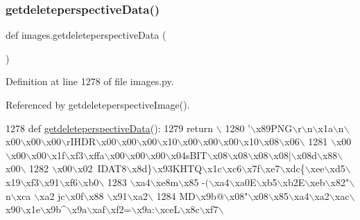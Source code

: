 \subsubsection{\texorpdfstring{getdeleteperspective\+Data()}{getdeleteperspectiveData()}}
{\footnotesize\ttfamily def images.\+getdeleteperspective\+Data (\begin{DoxyParamCaption}{ }\end{DoxyParamCaption})}



Definition at line 1278 of file images.\+py.



Referenced by getdeleteperspective\+Image().


\begin{DoxyCode}
1278 \textcolor{keyword}{def }\hyperlink{namespaceimages_adf4a80b7f1fe515d188f8edc76ad9f8c}{getdeleteperspectiveData}():
1279     \textcolor{keywordflow}{return} \(\backslash\)
1280 \textcolor{stringliteral}{'\(\backslash\)x89PNG\(\backslash\)r\(\backslash\)n\(\backslash\)x1a\(\backslash\)n\(\backslash\)x00\(\backslash\)x00\(\backslash\)x00\(\backslash\)rIHDR\(\backslash\)x00\(\backslash\)x00\(\backslash\)x00\(\backslash\)x10\(\backslash\)x00\(\backslash\)x00\(\backslash\)x00\(\backslash\)x10\(\backslash\)x08\(\backslash\)x06\(\backslash\)}
1281 \textcolor{stringliteral}{\(\backslash\)x00\(\backslash\)x00\(\backslash\)x00\(\backslash\)x1f\(\backslash\)xf3\(\backslash\)xffa\(\backslash\)x00\(\backslash\)x00\(\backslash\)x00\(\backslash\)x04sBIT\(\backslash\)x08\(\backslash\)x08\(\backslash\)x08\(\backslash\)x08|\(\backslash\)x08d\(\backslash\)x88\(\backslash\)x00\(\backslash\)}
1282 \textcolor{stringliteral}{\(\backslash\)x00\(\backslash\)x02~IDAT8\(\backslash\)x8d\}\(\backslash\)x93KHTQ\(\backslash\)x1c\(\backslash\)xc6\(\backslash\)x7f\(\backslash\)xe7\(\backslash\)xdc\{\(\backslash\)xee\(\backslash\)xd5\(\backslash\)x19\(\backslash\)xf3\(\backslash\)x91\(\backslash\)xf6\(\backslash\)xb0\(\backslash\)}
1283 \textcolor{stringliteral}{\(\backslash\)xa4\(\backslash\)xe8m\(\backslash\)x85 -$($\(\backslash\)xa4\(\backslash\)xa0E\(\backslash\)xb5\(\backslash\)xb2E\(\backslash\)xeb\(\backslash\)x82"\(\backslash\)n\(\backslash\)xca \(\backslash\)xa2 jc\(\backslash\)x0f\(\backslash\)x88 \(\backslash\)x91\(\backslash\)xa2\(\backslash\)}
1284 \textcolor{stringliteral}{MD\(\backslash\)x9b@\(\backslash\)x08"\(\backslash\)x08\(\backslash\)x85\(\backslash\)xa4\(\backslash\)xa2\(\backslash\)xac\(\backslash\)x90\(\backslash\)x1e\(\backslash\)x9b^\(\backslash\)x9a\(\backslash\)xaf\(\backslash\)xf2=\(\backslash\)x9a:\(\backslash\)xceL\(\backslash\)x8c\(\backslash\)xf7\(\backslash\)}

\end{DoxyCode}
